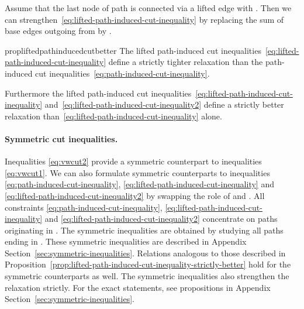 \documentclass{article}
\begin{document}
Assume that the last node  of path  is connected via a lifted edge with .
Then we can strengthen~\eqref{eq:lifted-path-induced-cut-inequality} by replacing the sum of base edges outgoing from  by .



\begin{restatable}{prop}{liftedpathinducedcutbetter}
\label{prop:lifted-path-induced-cut-inequality-strictly-better}
The lifted path-induced cut inequalities~\eqref{eq:lifted-path-induced-cut-inequality} define a strictly tighter relaxation than the path-induced cut inequalities~\eqref{eq:path-induced-cut-inequality}.

Furthermore the lifted path-induced cut inequalities~\eqref{eq:lifted-path-induced-cut-inequality} and~\eqref{eq:lifted-path-induced-cut-inequality2} define a strictly better relaxation than~\eqref{eq:lifted-path-induced-cut-inequality} alone.
\end{restatable}



\paragraph{Symmetric cut inequalities.}
Inequalities \eqref{eq:vwcut2} provide a symmetric counterpart to inequalities \eqref{eq:vwcut1}. 
We can also formulate symmetric counterparts to  inequalities \eqref{eq:path-induced-cut-inequality}, \eqref{eq:lifted-path-induced-cut-inequality} and \eqref{eq:lifted-path-induced-cut-inequality2} by swapping the role of  and .
 All constraints \eqref{eq:path-induced-cut-inequality}, \eqref{eq:lifted-path-induced-cut-inequality} and \eqref{eq:lifted-path-induced-cut-inequality2} concentrate on paths originating in . 
The symmetric inequalities are obtained by studying all paths ending in . 
These symmetric inequalities are described in Appendix Section~\ref{sec:symmetric-inequalities}.
Relations analogous to those described in Proposition~\ref{prop:lifted-path-induced-cut-inequality-strictly-better} hold for the symmetric counterparts as well.
The symmetric inequalities also strengthen the relaxation strictly.
For the exact statements, see propositions in Appendix Section~\ref{sec:symmetric-inequalities}.
\end{document}
